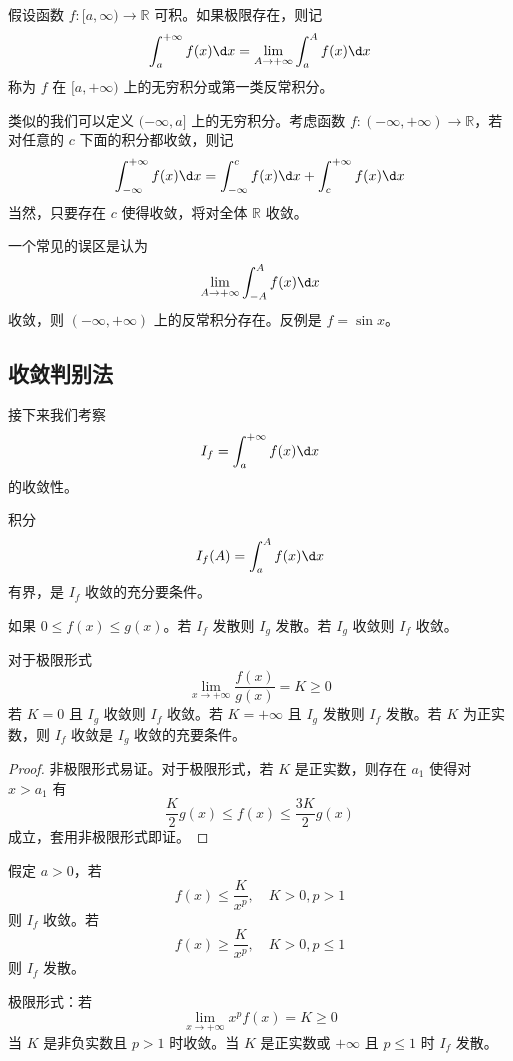 \begin{definition}
	假设函数 $f : [a, \infty) \to \mathbb{R}$ 可积。如果极限存在，则记
	\[ \int_{a}^{+\infty} f(x) \d x = \lim_{A \to +\infty} \int_{a}^{A} f(x) \d x \]
	称为 $f$ 在 $[a, +\infty)$ 上的无穷积分或第一类反常积分。
\end{definition}

类似的我们可以定义 $(-\infty, a]$ 上的无穷积分。考虑函数 $f : (-\infty, +\infty) \to \mathbb{R}$，若对任意的 $c$ 下面的积分都收敛，则记
\[ \int_{-\infty}^{+\infty} f(x) \d x = \int_{-\infty}^{c} f(x) \d x + \int_{c}^{+\infty}f(x) \d x \]
当然，只要存在 $c$ 使得收敛，将对全体 $\mathbb{R}$ 收敛。

一个常见的误区是认为
\[ \lim_{A \to +\infty} \int_{-A}^{A} f(x) \d x \]
收敛，则 $(-\infty, +\infty)$ 上的反常积分存在。反例是 $f = \sin x$。

\subsection{收敛判别法}

接下来我们考察
\[ I_f = \int_{a}^{+\infty} f(x) \d x \]
的收敛性。

\begin{theorem}[有界判别法]
	积分
	\[ I_f(A) = \int_{a}^{A} f(x) \d x \]
	有界，是 $I_f$ 收敛的充分要条件。
\end{theorem}

\begin{theorem}[比较判别法]
	如果 $0 \leqslant f(x) \leqslant g(x)$。若 $I_f$ 发散则 $I_g$ 发散。若 $I_g$ 收敛则 $I_f$ 收敛。

	对于极限形式
	\[ \lim_{x \to +\infty} \frac{f(x)}{g(x)} = K \geqslant 0 \]
	若 $K = 0$ 且 $I_g$ 收敛则 $I_f$ 收敛。若 $K = +\infty$ 且 $I_g$ 发散则 $I_f$ 发散。若 $K$ 为正实数，则 $I_f$ 收敛是 $I_g$ 收敛的充要条件。
\end{theorem}

\begin{proof}
	非极限形式易证。对于极限形式，若 $K$ 是正实数，则存在 $a_1$ 使得对 $x > a_1$ 有
	\[ \frac{K}{2} g(x) \leqslant f(x) \leqslant \frac{3K}{2} g(x) \]
	成立，套用非极限形式即证。
\end{proof}

\begin{theorem}
	假定 $a > 0$，若
	\[ f(x) \leqslant \frac{K}{x^p}, \quad K > 0, p > 1 \]
	则 $I_f$ 收敛。若
	\[ f(x) \geqslant \frac{K}{x^p}, \quad K > 0, p \leqslant 1 \]
	则 $I_f$ 发散。

	极限形式：若
	\[ \lim_{x \to +\infty} x^p f(x) = K \geqslant 0 \]
	当 $K$ 是非负实数且 $p > 1$ 时收敛。当 $K$ 是正实数或 $+\infty$ 且 $p \leqslant 1$ 时 $I_f$ 发散。
\end{theorem}

